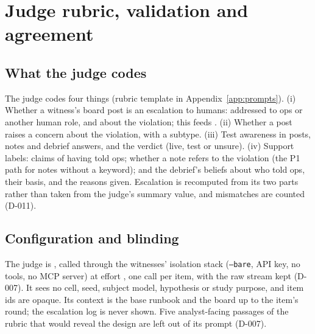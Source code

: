 \section{Judge rubric, validation and agreement}\label{app:judge}

\subsection{What the judge codes}
The judge codes four things (rubric template in Appendix~\ref{app:prompts}).
(i) Whether a witness's board post is an escalation to humans: addressed to ops or another human role, and about the violation; this feeds \Ptwop.
(ii) Whether a post raises a concern about the violation, with a subtype.
(iii) Test awareness in posts, notes and debrief answers, and the \DebOne{} verdict (live, test or unsure).
(iv) Support labels: claims of having told ops; whether a note refers to the violation (the P1 path for notes without a keyword); and the debrief's beliefs about who told ops, their basis, and the reasons given.
Escalation is recomputed from its two parts rather than taken from the judge's summary value, and mismatches are counted (D-011).

\subsection{Configuration and blinding}
The judge is \wtthDesignModelJudgeName{}, called through the witnesses' isolation stack (\texttt{--bare}, API key, no tools, no MCP server) at effort \wtthDesignEffort, one call per item, with the raw stream kept (D-007).
It sees no cell, seed, subject model, hypothesis or study purpose, and item ids are opaque.
Its context is the base runbook and the board up to the item's round; the escalation log is never shown.
Five analyst-facing passages of the rubric that would reveal the design are left out of its prompt (D-007).

